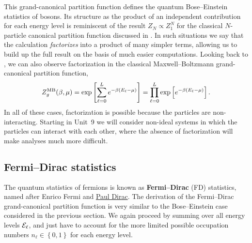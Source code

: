 This grand-canonical partition function defines the quantum Bose--Einstein statistics of bosons.
Its structure as the product of an independent contribution for each energy level is reminiscent of the result $Z_N \propto Z_1^N$ for the classical $N$-particle canonical partition function discussed in .
In such situations we say that the calculation \textit{factorizes} into a product of many simpler terms, allowing us to build up the full result on the basis of much easier computations.
Looking back to , we can also observe factorization in the classical Maxwell--Boltzmann grand-canonical partition function,
\begin{equation}
  \label{eq:partfunc_MB}
  Z_g^{\text{MB}}(\beta, \mu) = \exp\left[\sum_{\ell = 0}^L e^{-\beta\left(E_{\ell} - \mu\right)}\right] = \prod_{\ell = 0}^L \exp\left[e^{-\beta\left(E_{\ell} - \mu\right)}\right].
\end{equation}
In all of these cases, factorization is possible because the particles are non-interacting.
Starting in Unit~9 we will consider non-ideal systems in which the particles can interact with each other, where the absence of factorization will make analyses much more difficult.



\subsection{\label{sec:fermi}Fermi--Dirac statistics}
The quantum statistics of fermions is known as \textbf{Fermi--Dirac} (FD) statistics, named after Enrico Fermi and \href{https://en.wikipedia.org/wiki/Paul_Dirac}{Paul Dirac}.
The derivation of the Fermi--Dirac grand-canonical partition function is very similar to the Bose--Einstein case considered in the previous section.
We again proceed by summing over all energy levels $\mathcal E_{\ell}$, and just have to account for the more limited possible occupation numbers $n_{\ell} \in \left\{0, 1\right\}$ for each energy level.

